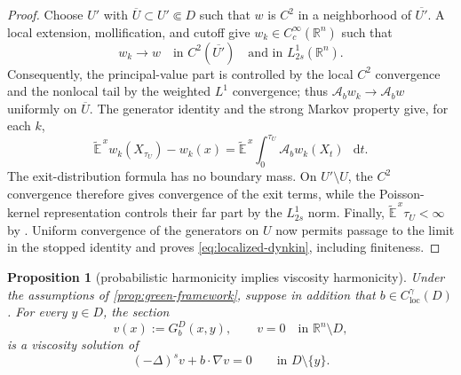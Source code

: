 \documentclass[reqno]{amsart}
\numberwithin{equation}{section}
\theoremstyle{plain}
\newtheorem{proposition}[theorem]{Proposition}
\theoremstyle{definition}
\theoremstyle{remark}
\newcommand{\R}{\mathbb R}
\newcommand{\differential}{\mathop{}\!\mathrm d}
\begin{document}
\begin{proof}
Choose $U'$ with $\overline U\subset U'\Subset D$ such that $w$ is $C^2$
in a neighborhood of $\overline{U'}$.  A local extension, mollification,
and cutoff give $w_k\in C_c^\infty(\R^n)$ such that
\[
 w_k\longrightarrow w\quad\text{in }C^2(\overline{U'})
 \quad\text{and in }L^1_{2s}(\R^n).
\]
Consequently, the principal-value part is controlled by the local $C^2$
convergence and the nonlocal tail by the weighted $L^1$ convergence; thus
$\mathcal A_bw_k\to\mathcal A_bw$ uniformly on $\overline U$.  The
generator identity \cite[(36)]{BogdanJakubowski2012} and the strong Markov
property give, for each $k$,
\[
 \widetilde{\mathbb E}^{\,x}w_k(X_{\tau_U})-w_k(x)
 =\widetilde{\mathbb E}^{\,x}\int_0^{\tau_U}
   \mathcal A_bw_k(X_t)\,\differential t.
\]
The exit-distribution formula \cite[Lemmas~6 and 14]{BogdanJakubowski2012}
has no boundary mass.  On $U'\setminus U$, the $C^2$ convergence therefore
gives convergence of the exit terms, while the Poisson-kernel
representation \cite[(38)--(39)]{BogdanJakubowski2012} controls their far
part by the $L^1_{2s}$ norm.  Finally,
$\widetilde{\mathbb E}^{\,x}\tau_U<\infty$ by
\cite[Lemma~7]{BogdanJakubowski2012}.  Uniform convergence of the
generators on $U$ now permits passage to the limit in the stopped identity
and proves \eqref{eq:localized-dynkin}, including finiteness.
\end{proof}

\begin{proposition}[probabilistic harmonicity implies viscosity harmonicity]
\label{prop:green-viscosity}
Under the assumptions of \cref{prop:green-framework}, suppose in addition
that $b\in C^\gamma_{\mathrm{loc}}(D)$.  For every $y\in D$, the section
\[
 v(x):=G_b^D(x,y),\qquad v=0\quad\text{in }\R^n\setminus D,
\]
is a viscosity solution of
\begin{equation}\label{eq:green-viscosity-equation}
 (-\Delta)^sv+b\cdot\nabla v=0
 \qquad\text{in }D\setminus\{y\}.
\end{equation}
\end{proposition}
\end{document}
